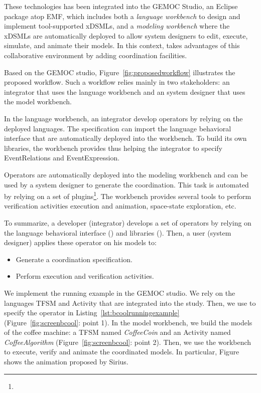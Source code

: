 These technologies has been integrated into the GEMOC Studio, an Eclipse package atop EMF, which includes both a \emph{language workbench} to design and implement tool-supported xDSMLs, and a \emph{modeling workbench} where the xDSMLs are automatically deployed to allow system designers to edit, execute, simulate, and animate their models. In this context, \bcool takes advantages of this collaborative environment by adding coordination facilities. 


Based on the GEMOC studio, Figure~\ref{fig:proposedworkflow} illustrates the proposed workflow. Such a workflow relies mainly in two stakeholders: an integrator that uses the language workbench and an system designer that uses the model workbench. 

In the language workbench, an integrator develop operators by relying on the deployed languages. The \bcool specification can import the language behavioral interface that are automatically deployed into the workbench. To build its own libraries, the workbench provides \moccml thus helping the integrator to specify EventRelations and EventExpression. 

Operators are automatically deployed into the modeling workbench and can be used by a system designer to generate the coordination. This task is automated by relying on a set of plugins\footnote{}. The workbench provides several tools to perform verification activities \eg execution and animation, space-state exploration, etc.  

To summarize, a \bcool developer (\ie integrator) develops a set of operators by relying on the language behavioral interface (\ecl) and libraries (\moccml). Then, a \bcool user (\ie system designer) applies these operator on his models to: 
		\begin{itemize}
			\item Generate a coordination specification.
			\item Perform execution and verification activities.
		\end{itemize}

We implement the running example in the GEMOC studio. We rely on the languages TFSM and Activity that are integrated into the study. Then, we use \bcool to specify the operator in Listing~\ref{lst:bcoolrunningexample} (Figure~\ref{fig:screenbcool}: point 1). In the model workbench, we build the models of the coffee machine: a TFSM named \emph{CoffeeCoin} and an Activity named \emph{CoffeeAlgorithm} (Figure~\ref{fig:screenbcool}: point 2). Then, we use the workbench to execute, verify and animate the coordinated models. In particular, Figure shows the animation proposed by Sirius.   

